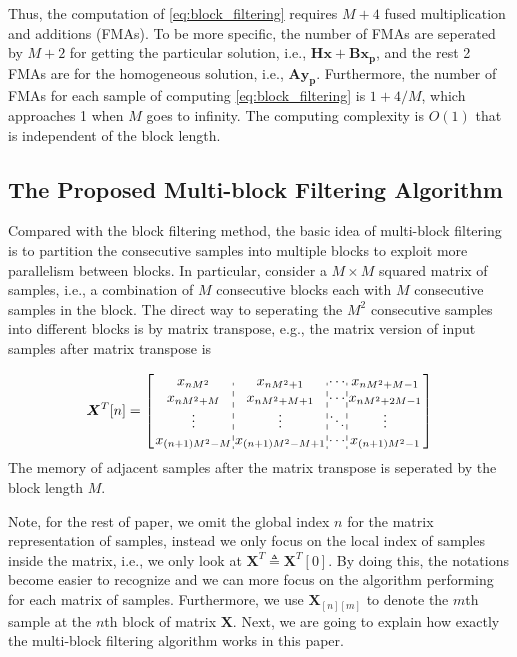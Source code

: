 Thus, the computation of \eqref{eq:block_filtering} requires $M+4$ fused multiplication and additions (FMAs).
To be more specific, the number of FMAs are seperated by $M{+}2$ for getting the particular solution, i.e.,
$\bm{H}\bm{x}+\bm{B}\bm{x_p}$, and the rest 2 FMAs are for the homogeneous solution, i.e., $\bm{Ay_p}$.
Furthermore, the number of FMAs for each sample of computing \eqref{eq:block_filtering} is $1{+}4/M$, which  
approaches 1 when $M$ goes to infinity. The computing complexity is $O(1)$ that is independent of the block length. 

\subsection{The Proposed Multi-block Filtering Algorithm}

Compared with the block filtering method, the basic idea of multi-block filtering is to partition the consecutive samples into multiple blocks to exploit more
parallelism between blocks.
In particular, consider a $M \times M$ squared matrix of samples, i.e., a combination of $M$ consecutive blocks each with $M$ consecutive samples in the block.
The direct way to seperating the $M^2$ consecutive samples into different blocks is by matrix transpose,
e.g., the matrix version of input samples after matrix transpose is 

\begin{equation*}
    \begin{aligned}
    \bm{X}^T[n] = \left[
        \arraycolsep=1.0pt\def\arraystretch{1.0}
        \begin{array}{c:c:c:c}
        x_{nM^2} & x_{nM^2+1} & \cdots & x_{nM^2+M-1} \\ 
        x_{nM^2+M} & x_{nM^2+M+1} & \cdots & x_{nM^2+2M-1} \\
        \vdots & \vdots & \ddots & \vdots \\
        x_{(n+1)M^2-M} & x_{(n+1)M^2-M+1} &\cdots & x_{(n+1)M^2-1} \\
        \end{array}\right]
    \end{aligned}
\end{equation*}
The memory of adjacent samples after the matrix transpose is seperated by the block length $M$.

Note, for the rest of paper, we omit the global index $n$ for the matrix representation of samples,
instead we only focus on the local index of samples inside the matrix, i.e.,
we only look at $\bm{X}^T {\triangleq} \bm{X}^T[0]$.
By doing this, the notations become easier to recognize and 
we can more focus on the algorithm performing for each matrix of samples.
Furthermore, 
we use $\bm{X}_{[n][m]}$ to denote the $m$th sample at the $n$th block
of matrix $\bm{X}$. Next, we are going to explain how exactly the multi-block filtering algorithm works in this paper. 

